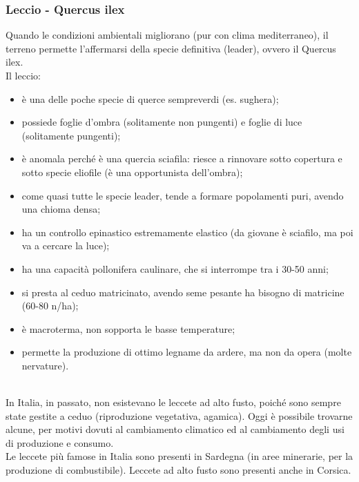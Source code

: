 \subsubsection{Leccio - Quercus ilex}
Quando le condizioni ambientali migliorano (pur con clima mediterraneo), il terreno permette l'affermarsi della specie definitiva (leader), ovvero il Quercus ilex.\\
Il leccio:
\begin{itemize}[nosep]
    \item è una delle poche specie di querce sempreverdi (es. sughera);
    \item possiede foglie d'ombra (solitamente non pungenti) e foglie di luce (solitamente pungenti);
    \item è anomala perché è una quercia sciafila: riesce a rinnovare sotto copertura e sotto specie eliofile (è una opportunista dell'ombra);
    \item come quasi tutte le specie leader, tende a formare popolamenti puri, avendo una chioma densa;
    \item ha un controllo epinastico estremamente elastico (da giovane è sciafilo, ma poi va a cercare la luce);
    \item ha una capacità pollonifera caulinare, che si interrompe tra i 30-50 anni;
    \item si presta al ceduo matricinato, avendo seme pesante ha bisogno di matricine (60-80 \unit{n/ha});
    \item è macroterma, non sopporta le basse temperature;
    \item permette la produzione di ottimo legname da ardere, ma non da opera (molte nervature).
\end{itemize}
\\
In Italia, in passato, non esistevano le leccete ad alto fusto, poiché sono sempre state gestite a ceduo (riproduzione vegetativa, agamica). Oggi è possibile trovarne alcune, per motivi dovuti al cambiamento climatico ed al cambiamento degli usi di produzione e consumo.\\
Le leccete più famose in Italia sono presenti in Sardegna (in aree minerarie, per la produzione di combustibile). Leccete ad alto fusto sono presenti anche in Corsica.\\
